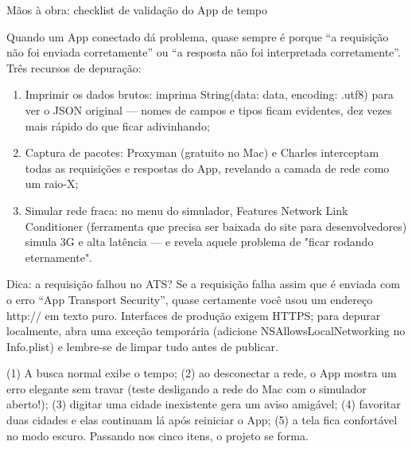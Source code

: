 \begin{tcbpractice}{Mãos à obra: checklist de validação do App de tempo}

Quando um App conectado dá problema, quase sempre é porque “a requisição não foi enviada corretamente” ou “a resposta não foi interpretada corretamente”. Três recursos de depuração:

\begin{enumerate}
  \item Imprimir os dados brutos: imprima String(data: data, encoding: .utf8) para ver o JSON original — nomes de campos e tipos ficam evidentes, dez vezes mais rápido do que ficar adivinhando;
  \item Captura de pacotes: Proxyman (gratuito no Mac) e Charles interceptam todas as requisições e respostas do App, revelando a camada de rede como um raio-X;
  \item Simular rede fraca: no menu do simulador, Features Network Link Conditioner (ferramenta que precisa ser baixada do site para desenvolvedores) simula 3G e alta latência — e revela aquele problema de "ficar rodando eternamente".
\end{enumerate}

\begin{tcbinfo}{Dica: a requisição falhou no ATS?}
Se a requisição falha assim que é enviada com o erro “App Transport Security”, quase certamente você usou um endereço http:// em texto puro. Interfaces de produção exigem HTTPS; para depurar localmente, abra uma exceção temporária (adicione NSAllowsLocalNetworking no Info.plist) e lembre-se de limpar tudo antes de publicar.

\end{tcbinfo}

(1) A busca normal exibe o tempo; (2) ao desconectar a rede, o App mostra um erro elegante sem travar (teste desligando a rede do Mac com o simulador aberto!); (3) digitar uma cidade inexistente gera um aviso amigável; (4) favoritar duas cidades e elas continuam lá após reiniciar o App; (5) a tela fica confortável no modo escuro. Passando nos cinco itens, o projeto se forma.

\end{tcbpractice}

